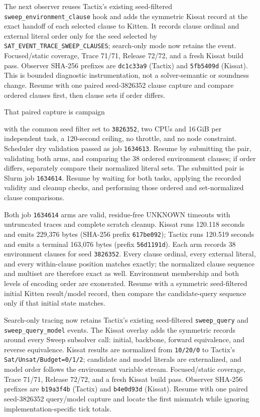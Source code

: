 \documentclass[11pt]{article}
\newcommand{\code}[1]{\texttt{#1}}
\newcommand{\artifact}[1]{\path{#1}}
\begin{document}
The next observer reuses Tactix's existing seed-filtered
\code{sweep\_environment\_clause} hook and adds the symmetric Kissat record at
the exact handoff of each selected clause to Kitten. It records clause ordinal
and external literal order only for the seed selected by
\code{SAT\_EVENT\_TRACE\_SWEEP\_CLAUSES}; search-only mode now retains the
event. Focused/static coverage, Trace 71/71, Release 72/72, and a fresh Kissat
build pass. Observer SHA-256 prefixes are \code{dc1c33a9} (Tactix) and
\code{5fb5409d} (Kissat). This is bounded diagnostic instrumentation, not a
solver-semantic or soundness change. Resume with one paired seed-3826352 clause
capture and compare ordered clauses first, then clause sets if order differs.

That paired capture is campaign
\begin{center}\small\artifact{20260819-1143-tierd-rank22-sweep-clauses}\end{center}
with the common seed filter set to \code{3826352}, two CPUs and 16\,GiB per
independent task, a 120-second ceiling, no throttle, and no node constraint.
Scheduler dry validation passed as job \code{1634613}. Resume by submitting the
pair, validating both arms, and comparing the 38 ordered environment clauses;
if order differs, separately compare their normalized literal sets.
The submitted pair is Slurm job \code{1634614}. Resume by waiting for both
tasks, applying the recorded validity and cleanup checks, and performing those
ordered and set-normalized clause comparisons.

Both job \code{1634614} arms are valid, residue-free UNKNOWN timeouts with
untruncated traces and complete scratch cleanup. Kissat runs 120.118 seconds
and emits 229,376 bytes (SHA-256 prefix \code{617be092}); Tactix runs 120.519
seconds and emits a terminal 163,076 bytes (prefix \code{56d1191d}). Each arm
records 38 environment clauses for seed \code{3826352}. Every clause ordinal,
every external literal, and every within-clause position matches exactly; the
normalized clause sequence and multiset are therefore exact as well.
Environment membership and both levels of encoding order are exonerated.
Resume with a symmetric seed-filtered initial Kitten result/model record, then
compare the candidate-query sequence only if that initial state matches.

Search-only tracing now retains Tactix's existing seed-filtered
\code{sweep\_query} and \code{sweep\_query\_model} events. The Kissat overlay
adds the symmetric records around every Sweep subsolver call: initial,
backbone, forward equivalence, and reverse equivalence. Kissat results are
normalized from \code{10/20/0} to Tactix's \code{Sat/Unsat/Budget=0/1/2};
candidate and model literals are externalized, and model order follows the
environment variable stream. Focused/static coverage, Trace 71/71, Release
72/72, and a fresh Kissat build pass. Observer SHA-256 prefixes are
\code{b19a3f4b} (Tactix) and \code{b4e0d93d} (Kissat). Resume with one paired
seed-3826352 query/model capture and locate the first mismatch while ignoring
implementation-specific tick totals.
\end{document}
